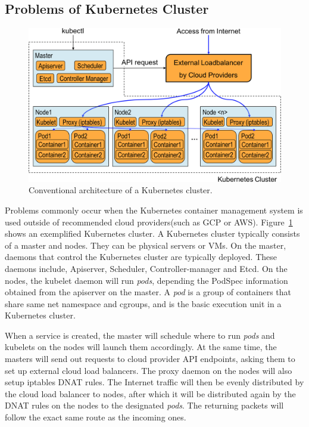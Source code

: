 \subsection{Problems of Kubernetes Cluster}

\begin{figure}[tb]
\includegraphics[width=\columnwidth]{Figs/K8sConventional}
\caption{Conventional architecture of a Kubernetes cluster.}
\label{fig:K8sConventional}
\end{figure}

Problems commonly occur when the Kubernetes container management system is used outside of recommended cloud providers(such as GCP or AWS).
Figure~\ref{fig:K8sConventional} shows an exemplified Kubernetes cluster.
A Kubernetes cluster typically consists of a master and nodes. They can be physical servers or VMs.
On the master, daemons that control the Kubernetes cluster are typically deployed. 
These daemons include, Apiserver, Scheduler, Controller-manager and Etcd. 
On the nodes, the kubelet daemon will run {\it pods}, depending the PodSpec information obtained from the apiserver on the master.
A {\em pod} is a group of containers that share same net namespace and cgroups, 
and is the basic execution unit in a Kubernetes cluster.

When a service is created, the master will schedule where to run {\em pods} and kubelets on the nodes will launch them accordingly.
At the same time, the masters will send out requests to cloud provider API endpoints, asking them to set up external cloud load balancers.
The proxy daemon on the nodes will also setup iptables DNAT\cite{MartinA.Brown2017} rules. 
The Internet traffic will then be evenly distributed by the cloud load balancer to nodes, 
after which it will be distributed again by the DNAT rules on the nodes to the designated {\em pods}. 
The returning packets will follow the exact same route as the incoming ones.

